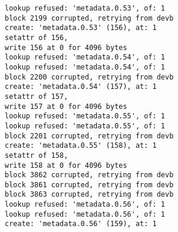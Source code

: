 \begin{lstlisting}[language={},basicstyle=\tiny,caption={Corruption debug output},label={fig_corruption}]
lookup refused: 'metadata.0.53', of: 1
block 2199 corrupted, retrying from devb
create: 'metadata.0.53' (156), at: 1
setattr of 156,
write 156 at 0 for 4096 bytes
lookup refused: 'metadata.0.54', of: 1
lookup refused: 'metadata.0.54', of: 1
block 2200 corrupted, retrying from devb
create: 'metadata.0.54' (157), at: 1
setattr of 157,
write 157 at 0 for 4096 bytes
lookup refused: 'metadata.0.55', of: 1
lookup refused: 'metadata.0.55', of: 1
block 2201 corrupted, retrying from devb
create: 'metadata.0.55' (158), at: 1
setattr of 158,
write 158 at 0 for 4096 bytes
block 3862 corrupted, retrying from devb
block 3861 corrupted, retrying from devb
block 3863 corrupted, retrying from devb
lookup refused: 'metadata.0.56', of: 1
lookup refused: 'metadata.0.56', of: 1
create: 'metadata.0.56' (159), at: 1
\end{lstlisting}

